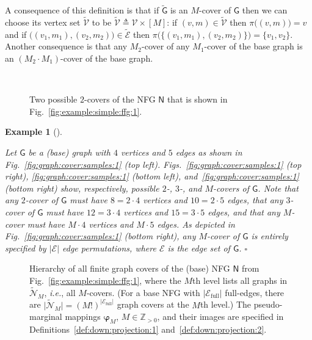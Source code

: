 \documentclass[journal, twocolumn]{IEEEtran}
\newcommand{\ie}{\emph{i.e.}}
\newcommand{\Z}{\mathbb{Z}}
\newcommand{\Zpp}{\Z_{>0}}
\newcommand{\set}[1]{\mathcal{#1}}
\newcommand{\graph}[1]{\mathsf{#1}}
\newcommand{\defeq}{\triangleq}
\newcommand{\setE}{\set{E}}
\newcommand{\setEfull}{\set{E}_{\mathrm{full}}}
\newcommand{\graphN}{\graph{N}}
\newcommand{\cover}[1]{\tilde{#1}}
\newcommand{\cset}[1]{\cover{\set{#1}}}
\newcommand{\cgraph}[1]{\cover{\graph{#1}}}
\newcommand{\card}[1]{\left\lvert #1 \right\rvert}
\newcommand{\cardbig}[1]{\big\lvert #1 \big\rvert}
\newcommand{\?}{\mathrm{?}}
\newcommand{\varphiM}{\boldsymbol{\varphi}_{M}}
\newcommand{\qedwhite}{\hspace*{\fill}%
  $\square$\smallskip}
\newcommand{\exampleend}{\qedwhite}
\newtheorem{Example}[Lemma]{Example}
\begin{document}
A consequence of this definition is that if $\cgraph{G}$ is an $M$-cover of
$\graph{G}$ then we can choose its vertex set $\cset{V}$ to be $\cset{V}
\defeq \set{V} \times [M]$: if $(v,m) \in \cset{V}$ then $\pi\big( (v,m) \big)
= v$ and if $\big( (v_1,m_1), (v_2,m_2) \big) \in \cset{E}$ then $\pi\big(
\big\{ (v_1,m_1), (v_2,m_2) \big\} \big) = \{ v_1, v_2 \}$. Another
consequence is that any $M_2$-cover of any $M_1$-cover of the base graph is an
$(M_2 \cdot M_1)$-cover of the base graph.


\begin{figure}
  \begin{center}
     \\[0.5cm]
  \end{center}
  \caption{Two possible $2$-covers of the NFG $\graphN$ that is shown in
    Fig.~\ref{fig:example:simple:ffg:1}.}
  \label{fig:example:simple:ffg:1:cover:1}
\end{figure}




\begin{Example}[\!\!\cite{Vontobel:Koetter:05:1:subm}]
  \label{example:four:vertex:five:edges:graph:finite:graph:covers:1}

  Let $\graph{G}$ be a (base) graph with $4$ vertices and $5$ edges as shown
  in Fig.~\ref{fig:graph:cover:samples:1} (top
  left). Figs.~\ref{fig:graph:cover:samples:1} (top right),
  \ref{fig:graph:cover:samples:1} (bottom left),
  and~\ref{fig:graph:cover:samples:1} (bottom right) show, respectively,
  possible $2$-, $3$-, and $M$-covers of $\graph{G}$. Note that any $2$-cover
  of $\graph{G}$ must have $8 = 2 \cdot 4$ vertices and $10 = 2 \cdot 5$
  edges, that any $3$-cover of $\graph{G}$ must have $12 = 3 \cdot 4$ vertices
  and $15 = 3 \cdot 5$ edges, and that any $M$-cover must have $M \cdot 4$
  vertices and $M \cdot 5$ edges. As depicted in
  Fig.~\ref{fig:graph:cover:samples:1} (bottom right), any $M$-cover of
  $\graph{G}$ is entirely specified by $\card{\set{E}}$ edge permutations,
  where $\setE$ is the edge set of $\graph{G}$.  \exampleend
\end{Example}


\begin{figure}
  \hskip1.5cm
  \vskip0.5cm
  \caption{Hierarchy of all finite graph covers of the (base) NFG $\graphN$
    from Fig.~\ref{fig:example:simple:ffg:1}, where the $M$th level lists
    all graphs in $\cset{N}_M$, \ie, all $M$-covers. (For a base NFG with
    $\card{\setEfull}$ full-edges, there are $\cardbig{\cset{N}_M} =
    (M!)^{\card{\setEfull}}$ graph covers at the $M$th level.) The
    pseudo-marginal mappings $\varphiM$, $M \in \Zpp$, and their images are
    specified in Definitions~\ref{def:down:projection:1}
    and~\ref{def:down:projection:2}.}
  \label{fig:example:simple:ffg:1:cover:hierarchy:1}
\end{figure}
\end{document}
